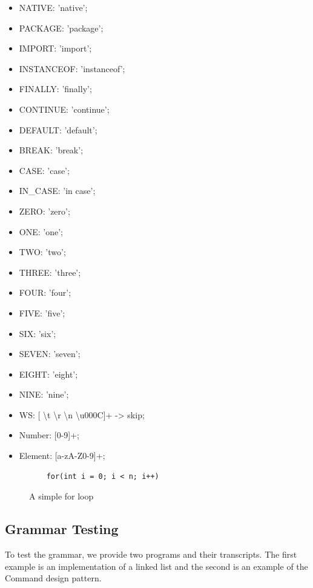 \begin{itemize}
	\item NATIVE: 'native';
	\item PACKAGE: 'package';
	\item IMPORT: 'import';
	\item INSTANCEOF: 'instanceof';
	\item FINALLY: 'finally';
	\item CONTINUE: 'continue';
	\item DEFAULT: 'default';
	\item BREAK: 'break';
	\item CASE: 'case';
	\item IN\_CASE: 'in case';
	\item ZERO: 'zero';
	\item ONE: 'one';
	\item TWO: 'two';
	\item THREE: 'three';
	\item FOUR: 'four';
	\item FIVE: 'five';
	\item SIX: 'six';
	\item SEVEN: 'seven';
	\item EIGHT: 'eight';
	\item NINE: 'nine';
	\item WS: [ \textbackslash t \textbackslash r \textbackslash n \textbackslash u000C]+ -> skip;
	\item Number: [0-9]+;
	\item Element: [a-zA-Z0-9\-]+;
\end{itemize}

\begin{figure}[H]
	\begin{lstlisting}
	for(int i = 0; i < n; i++)
	\end{lstlisting}
	\caption{A simple for loop}
	\label{fig20}
\end{figure}

\subsection{Grammar Testing} \label{subsection: Grammar Testing}
To test the grammar, we provide two programs and their transcripts. The first example is an implementation of a linked list and the second is an example of the Command design pattern. 
